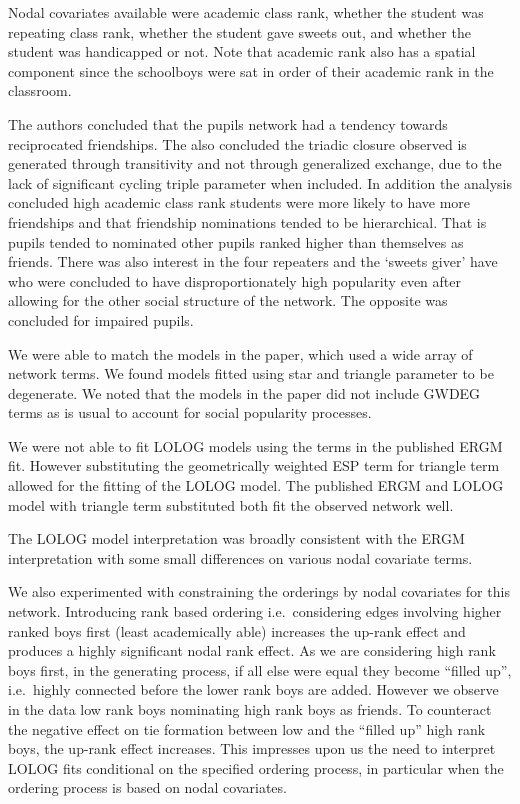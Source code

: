 \documentclass[
]{statsoc}
\begin{document}
Nodal covariates available were academic class rank, whether the student
was repeating class rank, whether the student gave sweets out, and
whether the student was handicapped or not. Note that academic rank also
has a spatial component since the schoolboys were sat in order of their
academic rank in the classroom.

The authors concluded that the pupils network had a tendency towards
reciprocated friendships. The also concluded the triadic closure
observed is generated through transitivity and not through generalized
exchange, due to the lack of significant cycling triple parameter when
included. In addition the analysis concluded high academic class rank
students were more likely to have more friendships and that friendship
nominations tended to be hierarchical. That is pupils tended to
nominated other pupils ranked higher than themselves as friends. There
was also interest in the four repeaters and the `sweets giver' have who
were concluded to have disproportionately high popularity even after
allowing for the other social structure of the network. The opposite was
concluded for impaired pupils.

We were able to match the models in the paper, which used a wide array
of network terms. We found models fitted using star and triangle
parameter to be degenerate. We noted that the models in the paper did
not include GWDEG terms as is usual to account for social popularity
processes.

We were not able to fit LOLOG models using the terms in the published
ERGM fit. However substituting the geometrically weighted ESP term for
triangle term allowed for the fitting of the LOLOG model. The published
ERGM and LOLOG model with triangle term substituted both fit the
observed network well.

The LOLOG model interpretation was broadly consistent with the ERGM
interpretation with some small differences on various nodal covariate
terms.

We also experimented with constraining the orderings by nodal covariates
for this network. Introducing rank based ordering i.e.~considering edges
involving higher ranked boys first (least academically able) increases
the up-rank effect and produces a highly significant nodal rank effect.
As we are considering high rank boys first, in the generating process,
if all else were equal they become ``filled up'', i.e.~highly connected
before the lower rank boys are added. However we observe in the data low
rank boys nominating high rank boys as friends. To counteract the
negative effect on tie formation between low and the ``filled up'' high
rank boys, the up-rank effect increases. This impresses upon us the need
to interpret LOLOG fits conditional on the specified ordering process,
in particular when the ordering process is based on nodal covariates.
\end{document}
